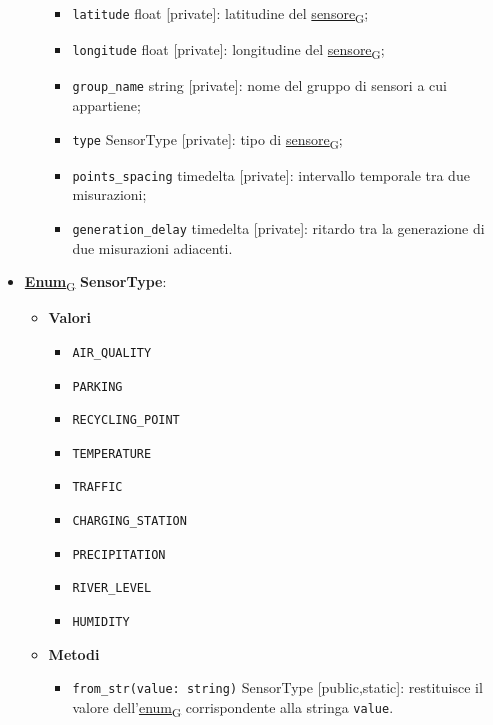 \begin{itemize}
\begin{itemize}
\begin{itemize}
			            \item \texttt{latitude} float [private]: latitudine del \href{https://7last.github.io/docs/pb/documentazione-interna/glossario\#sensore}{sensore\textsubscript{G}};
			            \item \texttt{longitude} float [private]: longitudine del \href{https://7last.github.io/docs/pb/documentazione-interna/glossario\#sensore}{sensore\textsubscript{G}};
			            \item \texttt{group\_name} string [private]: nome del gruppo di sensori a cui appartiene;
			            \item \texttt{type} SensorType [private]: tipo di \href{https://7last.github.io/docs/pb/documentazione-interna/glossario\#sensore}{sensore\textsubscript{G}};
			            \item \texttt{points\_spacing} timedelta [private]: intervallo temporale tra due misurazioni;
			            \item \texttt{generation\_delay} timedelta [private]: ritardo tra la generazione di due misurazioni adiacenti.
		            \end{itemize}
	      \end{itemize}
	\item \href{https://7last.github.io/docs/pb/documentazione-interna/glossario\#enumerazione}{\textbf{Enum}\textsubscript{G}}\textbf{ SensorType}:
	      \begin{itemize}
		      \item \textbf{Valori}
		            \begin{itemize}
			            \item \texttt{AIR\_QUALITY}
			            \item \texttt{PARKING}
			            \item \texttt{RECYCLING\_POINT}
			            \item \texttt{TEMPERATURE}
			            \item \texttt{TRAFFIC}
			            \item \texttt{CHARGING\_STATION}
			            \item \texttt{PRECIPITATION}
			            \item \texttt{RIVER\_LEVEL}
			            \item \texttt{HUMIDITY}
		            \end{itemize}
		      \item \textbf{Metodi}
		            \begin{itemize}
			            \item \texttt{from\_str(value: string)} SensorType [public,static]: restituisce il valore dell'\href{https://7last.github.io/docs/pb/documentazione-interna/glossario\#enumerazione}{enum\textsubscript{G}} corrispondente alla stringa \texttt{value}.

\end{itemize}
\end{itemize}
\end{itemize}

